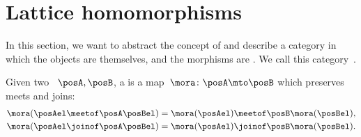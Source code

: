 \section{Lattice homomorphisms}
In this section, we want to abstract the concept of  and describe a category in which the objects are  themselves, and the morphisms are .
We call this category~\Lat.

\begin{ctdefinition}
    \label{def:lattice-homomorphism}
    Given two ~$\posA, \posB$, a  is a map~$\mora\colon \posA\mto \posB$ which preserves meets and joins:
    \begin{equation}
        \begin{aligned}
            \mora(\posAel \meetof\posA \posBel) & = \mora(\posAel) \meetof\posB \mora(\posBel), \\
            \mora(\posAel \joinof\posA \posBel) & = \mora(\posAel) \joinof\posB \mora(\posBel).
        \end{aligned}
    \end{equation}
\end{ctdefinition}

